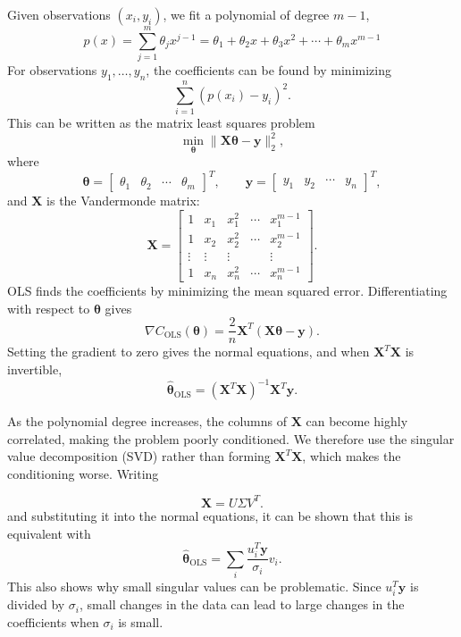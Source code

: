 \documentclass[amssymb,twocolumn,aps]{revtex4}
\begin{document}
Given observations $(x_i,y_i)$, we fit a polynomial of degree $m-1$,
\[
    p(x) = \sum_{j=1}^{m} \theta_j x^{j-1} = \theta_1 + \theta_2x + \theta_3x^2 + \cdots + \theta_mx^{m-1}
\]
For observations $y_1,\ldots,y_n$, the coefficients can be found by minimizing
\[
    \sum_{i=1}^{n} \left(p(x_i)-y_i\right)^2.
\]
This can be written as the matrix least squares problem
\[
    \min_{\boldsymbol{\theta}} \|\boldsymbol{X}\mathbf{\boldsymbol{\theta}}-\mathbf{\boldsymbol{y}}\|_2^2,
\]
where
\[
    \boldsymbol{\theta}=
    \begin{bmatrix}
        \theta_1 & \theta_2 & \cdots & \theta_m
    \end{bmatrix}^T,
    \qquad
    \mathbf{\boldsymbol{y}}
    =
    \begin{bmatrix}
        y_1 & y_2 & \cdots & y_n
    \end{bmatrix}^T,
\]
and $\boldsymbol{X}$ is the Vandermonde matrix:
\[
    \boldsymbol{X} =
    \begin{bmatrix}
        1      & x_1    & x_1^2  & \cdots & x_1^{m-1} \\
        1      & x_2    & x_2^2  & \cdots & x_2^{m-1} \\
        \vdots & \vdots & \vdots &        & \vdots    \\
        1      & x_n    & x_n^2  & \cdots & x_n^{m-1}
    \end{bmatrix}.
\]
OLS finds the coefficients by minimizing the mean squared error. Differentiating with respect to $\boldsymbol{\theta}$ gives
\[
    \nabla C_{\mathrm{OLS}}(\boldsymbol{\theta})
    =
    \frac{2}{n}\boldsymbol{X}^T(\boldsymbol{X}\boldsymbol{\theta}-\mathbf{\boldsymbol{y}}).
\]
Setting the gradient to zero gives the normal equations, and when $\boldsymbol{X}^T\boldsymbol{X}$ is invertible,
\begin{equation}
    \hat{\boldsymbol{\theta}}_{\mathrm{OLS}}
    =
    (\boldsymbol{X}^T\boldsymbol{X})^{-1}\boldsymbol{X}^T\mathbf{\boldsymbol{y}}.
    \label{eq}
\end{equation}

As the polynomial degree increases, the columns of $\boldsymbol{X}$ can become highly correlated, making the problem poorly conditioned. We therefore use the singular value decomposition (SVD) rather than forming $\boldsymbol{X}^T\boldsymbol{X}$, which makes the conditioning worse. Writing

\[
    \boldsymbol{X}=U\Sigma V^T.
\]
and substituting it into the normal equations, it can be shown \cite{lecturebook} that this is equivalent with
\begin{equation}
    \hat{\boldsymbol{\theta}}_{\mathrm{OLS}}
    =
    \sum_i
    \frac{u_i^T\mathbf{\boldsymbol{y}}}{\sigma_i}v_i.
    \label{eq:ols_svd_sum}
\end{equation}
This also shows why small singular values can be problematic. Since $u_i^T\mathbf y$ is divided by $\sigma_i$, small changes in the data can lead to large changes in the coefficients when $\sigma_i$ is small.
\end{document}
